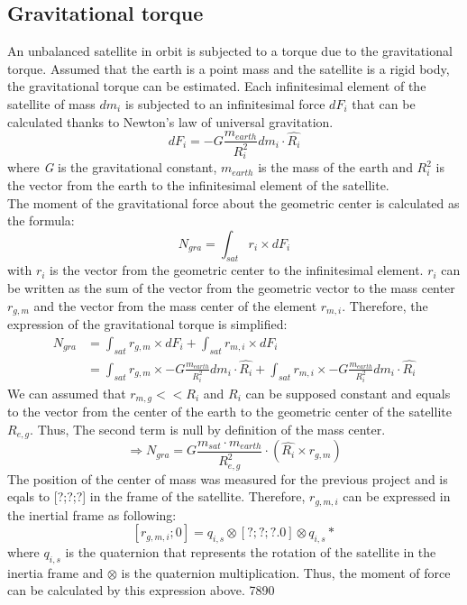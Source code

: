 \subsection{Gravitational torque}
An unbalanced satellite in orbit is subjected to a torque due to the gravitational torque. Assumed that the earth is a point mass and the satellite is a rigid body, the gravitational torque can be estimated. Each infinitesimal element of the satellite of mass \textit{$dm_i$} is subjected to an infinitesimal force \textit{$dF_i$} that can be calculated thanks to Newton's law of universal gravitation.
\[
dF_i = -G\frac{m_{earth}}{R_i^2}dm_i \cdot \hat{R_i}
\]
where \textit{G} is the gravitational constant, \textit{$m_{earth}$} is the mass of the earth and \textit{$R_i^2$} is the vector from the earth to the infinitesimal element of the satellite. \\
The moment of the gravitational force about the geometric center is calculated as the formula:
\[
N_{gra} = \int_{sat} r_i \times dF_i 
\]
with $r_i$ is the vector from the geometric center to the infinitesimal element. $r_i$ can be written as the sum of the vector from the geometric vector to the mass center $r_{g,m}$ and the vector from the mass center of the element $r_{m,i}$. Therefore, the expression of the gravitational torque is simplified:
\begin{align*}
	N_{gra} &= \int_{sat} r_{g,m} \times dF_i + \int_{sat} r_{m,i} \times dF_i \\
	&= \int_{sat} r_{g,m} \times -G\frac{m_{earth}}{R_i^2}dm_i \cdot \hat{R_i} + \int_{sat} r_{m,i} \times -G\frac{m_{earth}}{R_i^2}dm_i \cdot \hat{R_i}
\end{align*}
We can assumed that $r_{m,g} << R_i$ and $R_i$ can be supposed constant and equals to the vector from the center of the earth to the geometric center of the satellite $R_{e,g}$. Thus, The second term is null by definition of the mass center.
\[
\Rightarrow N_{gra} = G\frac{m_{sat} \cdot m_{earth}}{R_{e,g}^2} \cdot (\hat{R_i} \times r_{g,m})
\]
The position of the center of mass was measured for the previous project and is eqals to [?;?;?] in the frame of the satellite. Therefore, $r_{g,m,i}$ can be expressed in the inertial frame as following:
\[
[r_{g,m,i};0] = q_{i,s} \otimes [?;?;?.0] \otimes q_{i,s}*
\]
where $q_{i,s}$ is the quaternion that represents the rotation of the satellite in the inertia frame and $\otimes$ is the quaternion multiplication. Thus, the moment of force can be calculated by this expression above.
  7890